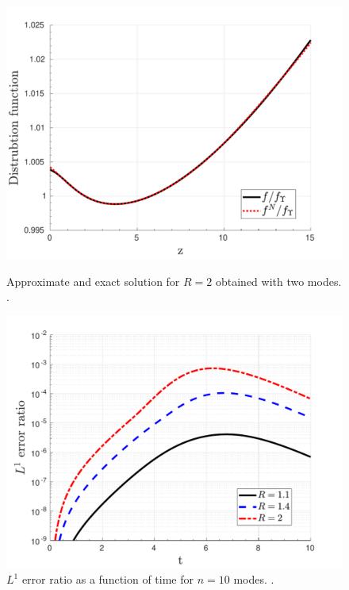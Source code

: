 \begin{figure}[ht]
\centerline{\includegraphics[width=0.9\linewidth]{06-appendix/SpectralMethodBoltzmann/Figures/keq_approx_T_r_2.pdf}}
\caption{Approximate and exact solution for $R=2$ obtained with two modes. .}\label{fig:keqApproxTr2}
\centerline{\includegraphics[width=0.9\linewidth]{06-appendix/SpectralMethodBoltzmann/Figures/keq_L1_err_time.pdf}}
\caption{$L^1$ error ratio as a function of time for $n=10$ modes. .}\label{fig:keqL1errTime}
\end{figure}


\clearpage